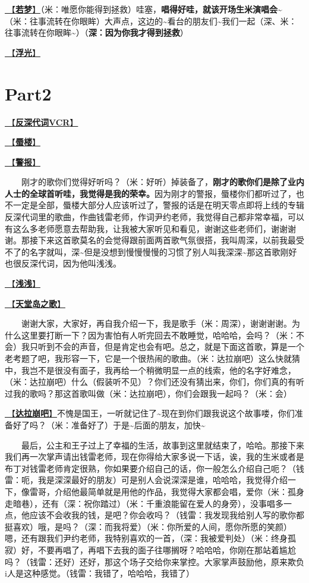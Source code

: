 \documentclass[]{ctexbook}
\begin{document}
\hyperref[ruomeng]{🎵【\textbf{若梦}】}（米：唯愿你能得到拯救）哇塞，\textbf{唱得好哇，就该开场生米演唱会\textasciitilde{}}（米：往事流转在你眼眸）大声点，这边的\textasciitilde 看台的朋友们\textasciitilde 我们一起（深、米：往事流转在你眼眸\textasciitilde）（\textbf{深：因为你我才得到拯救}）

\hyperref[floating-light]{🎵【\textbf{浮光}】}

\section{Part2}\label{shanghai-20240518-part2}

\hyperref[senself-vcr]{🎥【\textbf{反深代词VCR}】}

\hyperref[mirage]{🎵【\textbf{蜃楼}】}

\hyperref[the-giver]{🎵【\textbf{警报}】}

  刚才的歌你们觉得好听吗？（米：好听）掉装备了，\textbf{刚才的歌你们是除了业内人士的全球首听哇，我觉得是我的荣幸。}因为刚才的警报，蜃楼你们都听过了，也不一定是全部，蜃楼大部分人应该听过了，警报的话是在明天零点即将上线的专辑反深代词里的歌曲，作曲钱雷老师，作词尹约老师，我觉得自己都非常幸福，可以有这么多老师愿意去帮助我，让我被大家听见和看见，谢谢这些老师们，谢谢谢谢。那接下来这首歌莫名的会觉得跟前面两首歌气氛很搭，我叫周深，以前我最受不了的名字就叫，深\textasciitilde 但是没想到慢慢慢慢的习惯了别人叫我深深\textasciitilde 那这首歌刚好也很反深代词，因为他叫浅浅。

\hyperref[qianqian]{🎵【\textbf{浅浅}】}

\hyperref[haven-song]{🎵【\textbf{天堂岛之歌}】}

  谢谢大家，大家好，再自我介绍一下，我是歌手（米：周深），谢谢谢谢。为什么这里要打断一下？因为害怕有人听完回去不敢睡觉，哈哈哈，会吗？（米：不会）我只听到不会的声音，但是肯定也会有吧。总之，就是下面这首歌，算是一个老考题了吧，我形容一下，它是一个很热闹的歌曲。（米：达拉崩吧）这么快就猜中，我岂不是很没有面子，我再给一个稍微明显一点的线索，他的名字好难念，（米：达拉崩吧）什么（假装听不见）？你们还没有猜出来，你们，你们真的有听过我的歌吗？那这首歌叫做（米：达拉崩吧），你们会跟我一起吗？（米：会）

\hyperref[dalabengba]{🎵【\textbf{达拉崩吧}】}不愧是国王，一听就记住了\textasciitilde 现在到你们跟我说这个故事喽，你们准备好了吗？（米：准备好了）于是\textasciitilde 后面的朋友，加快\textasciitilde{}

  最后，公主和王子过上了幸福的生活，故事到这里就结束了，哈哈。那接下来我们再一次掌声请出钱雷老师，现在你得给大家多说一下话，诶，我的生米或者是布丁对钱雷老师肯定很熟，你如果要介绍自己的话，你一般怎么介绍自己呃？（钱雷：呃，我是深深最好的朋友）可是别人会说深深是谁，哈哈哈，我觉得介绍一下，像雷哥，介绍他最简单就是用他的作品，我觉得大家都会唱，爱你（米：孤身走暗巷），还有（深：祝你踏过）（米：千重浪能留在爱人的身旁），没事唱多一点，他应该不会收我的钱，是吧？你会收吗？（钱雷：我发现我给别人写的歌你都挺喜欢）哦，是吗？（深：而我将爱）（米：你所爱的人间，愿你所愿的笑颜）嗯，还有跟我们尹约老师，我特别喜欢的一首，（深：我被爱判处）（米：终身孤寂）好，不要再唱了，再唱下去我的面子往哪搁呀？哈哈哈，你刚在那站着尴尬吗？（钱雷：还好）还好，那这个场子交给你来掌控。大家掌声鼓励他，原来欺负i人是这种感觉。（钱雷：我错了，哈哈哈，我错了）
\end{document}
